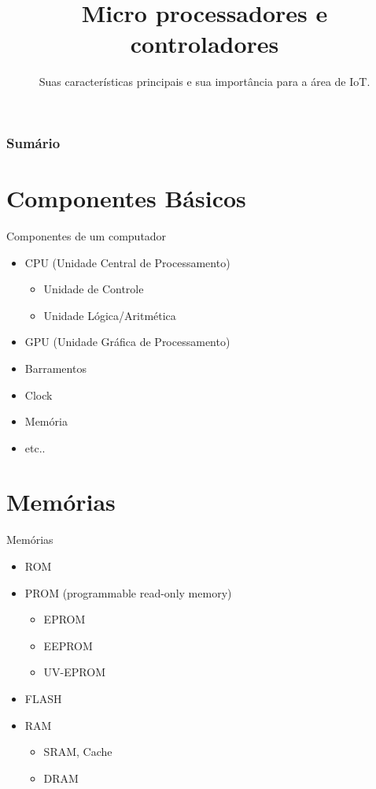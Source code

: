 \documentclass[t]{beamer}
\title{Micro processadores e controladores}
\subtitle{Suas características principais e sua importância para a área de IoT.}
\begin{document}
\frame{\titlepage}

\begin{frame}
\frametitle{Sumário}
\tableofcontents
\end{frame}

\section{Componentes Básicos}

\begin{frame}{Componentes de um computador}
	\begin{itemize}
		\item CPU (Unidade Central de Processamento)
		\begin{itemize}
			\item Unidade de Controle
			\item Unidade Lógica/Aritmética
		\end{itemize}
		\item GPU (Unidade Gráfica de Processamento)
		\item Barramentos
		\item Clock
		\item Memória
		\item etc..
	\end{itemize}
\end{frame}

\section{Memórias}

\begin{frame}{Memórias}
	\begin{itemize}
		\item ROM
		\item PROM (programmable read-only memory)
		\begin{itemize}
			\item EPROM
			\item EEPROM
			\item UV-EPROM
		\end{itemize}
		\item FLASH
		\item RAM
		\begin{itemize}
			\item SRAM, Cache
			\item DRAM
		\end{itemize}
	\end{itemize}
\end{frame}
\end{document}

